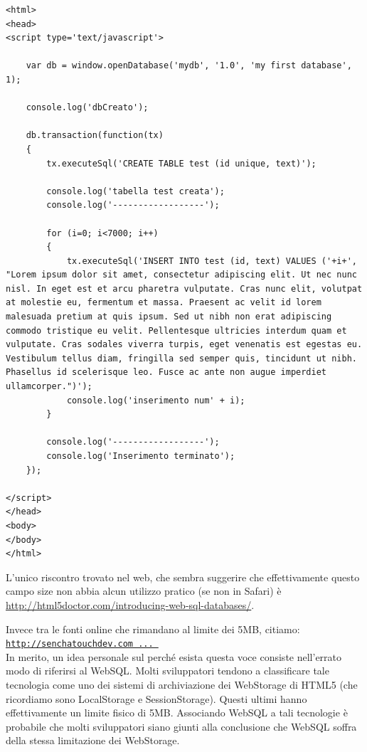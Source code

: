 \documentclass[10pt,a4paper,onecolumn]{article}
\begin{document}
\begin{lstlisting}
<html>
<head>
<script type='text/javascript'>

	var db = window.openDatabase('mydb', '1.0', 'my first database', 1);
	
	console.log('dbCreato');
	
	db.transaction(function(tx) 
	{
		tx.executeSql('CREATE TABLE test (id unique, text)');
		
		console.log('tabella test creata');
		console.log('------------------');
		
		for (i=0; i<7000; i++)
		{
			tx.executeSql('INSERT INTO test (id, text) VALUES ('+i+', "Lorem ipsum dolor sit amet, consectetur adipiscing elit. Ut nec nunc nisl. In eget est et arcu pharetra vulputate. Cras nunc elit, volutpat at molestie eu, fermentum et massa. Praesent ac velit id lorem malesuada pretium at quis ipsum. Sed ut nibh non erat adipiscing commodo tristique eu velit. Pellentesque ultricies interdum quam et vulputate. Cras sodales viverra turpis, eget venenatis est egestas eu. Vestibulum tellus diam, fringilla sed semper quis, tincidunt ut nibh. Phasellus id scelerisque leo. Fusce ac ante non augue imperdiet ullamcorper.")');
			console.log('inserimento num' + i);
		}
		
		console.log('------------------');
		console.log('Inserimento terminato');
	});
	
</script>
</head>
<body>
</body>
</html>
\end{lstlisting}

L'unico riscontro trovato nel web, che sembra suggerire che effettivamente questo campo size non abbia alcun utilizzo pratico (se non in Safari) è \url{http://html5doctor.com/introducing-web-sql-databases/}.

Invece tra le fonti online che rimandano al limite dei 5MB, citiamo:\\
\href{http://senchatouchdev.com/wordpress/2013/04/19/sencha-touch-clarifying-websql-sqlite-and-how-they-relate-to-sencha-touch/}{\texttt{http://senchatouchdev.com ... }}\\

In merito, un idea personale sul perché esista questa voce consiste nell'errato modo di riferirsi al WebSQL. Molti sviluppatori tendono a classificare tale tecnologia come uno dei sistemi di archiviazione dei WebStorage di HTML5 (che ricordiamo sono LocalStorage e SessionStorage). Questi ultimi hanno effettivamente un limite fisico di 5MB. Associando WebSQL a tali tecnologie è probabile che molti sviluppatori siano giunti alla conclusione che WebSQL soffra della stessa limitazione dei WebStorage.
\end{document}
